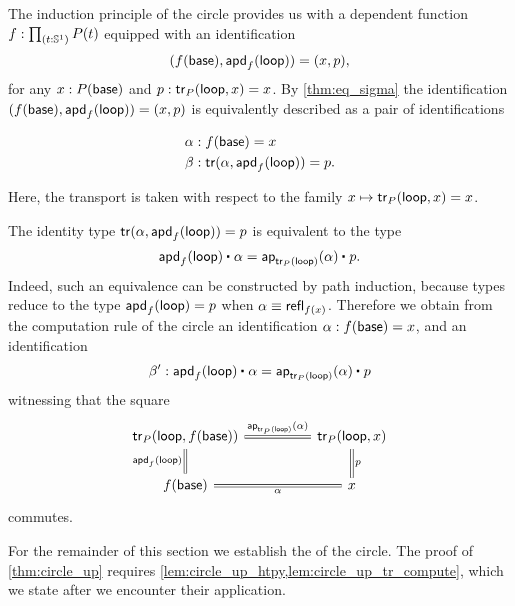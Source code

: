 \begin{rmk}
The induction principle of the circle provides us with a dependent function $f:\prd{t:\sphere{1}}P(t)$ equipped with an identification
\begin{equation*}
(f(\mathsf{base}),\mathsf{apd}_{f}\mathopen{}\left(\mathsf{loop}\right)\mathclose{})=(x,p),
\end{equation*}
for any $x : P(\mathsf{base})$ and $p : \mathsf{tr}_P(\mathsf{loop},x)=x$. By \cref{thm:eq_sigma} the identification
$(f(\mathsf{base}),\mathsf{apd}_{f}\mathopen{}\left(\mathsf{loop}\right)\mathclose{})=(x,p)$ is equivalently described as a pair of identifications
\begin{samepage}
\begin{align*}
\alpha & : f(\mathsf{base})= x \\
\beta & : \mathsf{tr}(\alpha,\mathsf{apd}_{f}\mathopen{}\left(\mathsf{loop}\right)\mathclose{}) = p.
\end{align*}\end{samepage}%
Here, the transport is taken with respect to the family $x\mapsto \mathsf{tr}_P(\mathsf{loop},x)=x$. 

The identity type $\mathsf{tr}(\alpha,\mathsf{apd}_{f}\mathopen{}\left(\mathsf{loop}\right)\mathclose{}) = p$ is equivalent to the type
\begin{equation*}
\ct{\apd{f}{\lloop}}{\alpha}=\ct{\mathsf{ap}_{\mathsf{tr}_P(\lloop)}(\alpha)}{p}.
\end{equation*}
Indeed, such an equivalence can be constructed by path induction, because types reduce to the type $\mathsf{apd}_{f}\mathopen{}\left(\mathsf{loop}\right)\mathclose{}=p$ when $\alpha\equiv\mathsf{refl}_{f(x)}$. Therefore we obtain from the computation rule of the circle an identification $\alpha:f(\mathsf{base})=x$, and an identification
\begin{equation*}
\beta':\ct{\apd{f}{\lloop}}{\alpha}=\ct{\mathsf{ap}_{\mathsf{tr}_P(\lloop)}(\alpha)}{p}
\end{equation*}
witnessing that the square
\begin{equation*}
\begin{tikzcd}[column sep=huge]
\mathsf{tr}_P(\lloop,f(\base)) \arrow[d,equals,swap,"\apd{f}{\lloop}"] \arrow[r,equals,"\ap{\mathsf{tr}_P(\lloop)}{\alpha}"] & \mathsf{tr}_P(\lloop,x) \arrow[d,equals,"p"] \\
f(\base) \arrow[r,equals,swap,"\alpha"] & x
\end{tikzcd}
\end{equation*}
commutes.
\end{rmk}

For the remainder of this section we establish the  of the circle. The proof of \cref{thm:circle_up} requires \cref{lem:circle_up_htpy,lem:circle_up_tr_compute}, which we state after we encounter their application.

